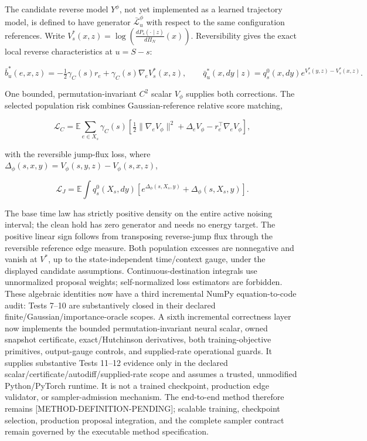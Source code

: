 \documentclass[11pt]{article}
\newcommand{\status}[1]{%
  \textcolor{statusred}{\textbf{\texttt{[#1]}}}%
}
\newcommand{\supportingfile}[2]{%
  \emph{#1} (\nolinkurl{#2})%
}
\def\status#1{[#1]}%
\def\supportingfile#1#2{#1}%
\begin{document}
The candidate reverse model \(Y^\phi\), not yet implemented as a learned trajectory model, is defined to have generator \(\bar{\mathcal L}_u^\phi\) with respect to the same configuration references. Write \(V_s^*(x,z)=\log\!\left(\frac{dP_s(\cdot\mid z)}{d\Pi_N}(x)\right)\). Reversibility gives the exact local reverse characteristics at \(u=S-s\):

\[
\bar b_u^*(e,x,z)
=-\tfrac12\gamma_C(s)r_e+\gamma_C(s)\nabla_eV_s^*(x,z),
\qquad
\bar q_u^*(x,dy\mid z)
=q_s^0(x,dy)e^{V_s^*(y,z)-V_s^*(x,z)}.
\]

One bounded, permutation-invariant \(C^2\) scalar \(V_\phi\) supplies both corrections. The selected population risk combines Gaussian-reference relative score matching,

\[
\mathcal L_C
=\mathbb E\sum_{e\in X_s}\gamma_C(s)
\left[\tfrac12\|\nabla_eV_\phi\|^2
+\Delta_eV_\phi-r_e^\top\nabla_eV_\phi\right],
\]

with the reversible jump-flux loss, where \(\Delta_\phi(s,x,y)=V_\phi(s,y,z)-V_\phi(s,x,z)\),

\[
\mathcal L_J
=\mathbb E\int q_s^0(X_s,dy)
\left[e^{\Delta_\phi(s,X_s,y)}+\Delta_\phi(s,X_s,y)\right].
\]

The base time law has strictly positive density on the entire active noising interval; the clean hold has zero generator and needs no energy target. The positive linear sign follows from transposing reverse-jump flux through the reversible reference edge measure. Both population excesses are nonnegative and vanish at \(V^*\), up to the state-independent time/\allowbreak{}context gauge, under the displayed candidate assumptions. Continuous-destination integrals use unnormalized proposal weights; self-normalized loss estimators are forbidden. These algebraic identities now have a third incremental NumPy equation-to-code audit: Tests 7--10 are substantively closed in their declared finite/\allowbreak{}Gaussian/\allowbreak{}importance-oracle scopes. A sixth incremental correctness layer now implements the bounded permutation-invariant neural scalar, owned snapshot certificate, exact/\allowbreak{}Hutchinson derivatives, both training-objective primitives, output-gauge controls, and supplied-rate operational guards. It supplies substantive Tests 11--12 evidence only in the declared scalar/\allowbreak{}certificate/\allowbreak{}autodiff/\allowbreak{}supplied-rate scope and assumes a trusted, unmodified Python/\allowbreak{}PyTorch runtime. It is not a trained checkpoint, production edge validator, or sampler-admission mechanism. The end-to-end method therefore remains \status{METHOD-DEFINITION-PENDING}; scalable training, checkpoint selection, production proposal integration, and the complete sampler contract remain governed by the \supportingfile{executable method specification}{executable_method_spec.md}.
\end{document}
